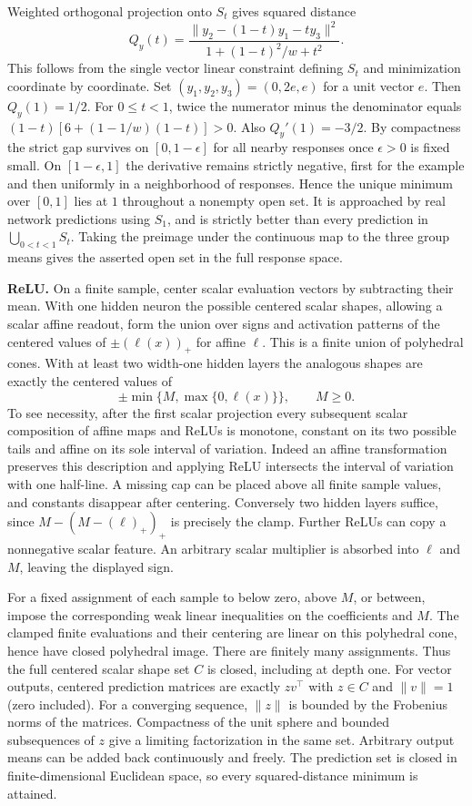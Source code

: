 \documentclass[10pt]{article}
\begin{document}
Weighted orthogonal projection onto $S_t$ gives squared distance
\[
 Q_y(t)=\frac{\|y_2-(1-t)y_1-t y_3\|^2}{1+(1-t)^2/w+t^2}.
\]
This follows from the single vector linear constraint defining $S_t$ and minimization coordinate by coordinate. Set $(y_1,y_2,y_3)=(0,2e,e)$ for a unit vector $e$. Then $Q_y(1)=1/2$. For $0\le t<1$, twice the numerator minus the denominator equals $(1-t)[6+(1-1/w)(1-t)]>0$. Also $Q_y'(1)=-3/2$. By compactness the strict gap survives on $[0,1-\epsilon]$ for all nearby responses once $\epsilon>0$ is fixed small. On $[1-\epsilon,1]$ the derivative remains strictly negative, first for the example and then uniformly in a neighborhood of responses. Hence the unique minimum over $[0,1]$ lies at $1$ throughout a nonempty open set. It is approached by real network predictions using $S_1$, and is strictly better than every prediction in $\bigcup_{0<t<1}S_t$. Taking the preimage under the continuous map to the three group means gives the asserted open set in the full response space.

\textbf{ReLU.} On a finite sample, center scalar evaluation vectors by subtracting their mean. With one hidden neuron the possible centered scalar shapes, allowing a scalar affine readout, form the union over signs and activation patterns of the centered values of $\pm(\ell(x))_+$ for affine $\ell$. This is a finite union of polyhedral cones. With at least two width-one hidden layers the analogous shapes are exactly the centered values of
\[
 \pm\min\{M,\max\{0,\ell(x)\}\},\qquad M\ge0.
\]
To see necessity, after the first scalar projection every subsequent scalar composition of affine maps and ReLUs is monotone, constant on its two possible tails and affine on its sole interval of variation. Indeed an affine transformation preserves this description and applying ReLU intersects the interval of variation with one half-line. A missing cap can be placed above all finite sample values, and constants disappear after centering. Conversely two hidden layers suffice, since $M-(M-(\ell)_+)_+$ is precisely the clamp. Further ReLUs can copy a nonnegative scalar feature. An arbitrary scalar multiplier is absorbed into $\ell$ and $M$, leaving the displayed sign.

For a fixed assignment of each sample to below zero, above $M$, or between, impose the corresponding weak linear inequalities on the coefficients and $M$. The clamped finite evaluations and their centering are linear on this polyhedral cone, hence have closed polyhedral image. There are finitely many assignments. Thus the full centered scalar shape set $C$ is closed, including at depth one. For vector outputs, centered prediction matrices are exactly $zv^\top$ with $z\in C$ and $\|v\|=1$ (zero included). For a converging sequence, $\|z\|$ is bounded by the Frobenius norms of the matrices. Compactness of the unit sphere and bounded subsequences of $z$ give a limiting factorization in the same set. Arbitrary output means can be added back continuously and freely. The prediction set is closed in finite-dimensional Euclidean space, so every squared-distance minimum is attained.
\end{document}

